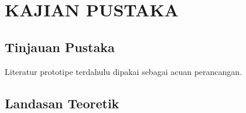 \chapter{KAJIAN PUSTAKA}
\section{Tinjauan Pustaka}
Literatur prototipe terdahulu dipakai sebagai acuan perancangan.

\section{Landasan Teoretik}
